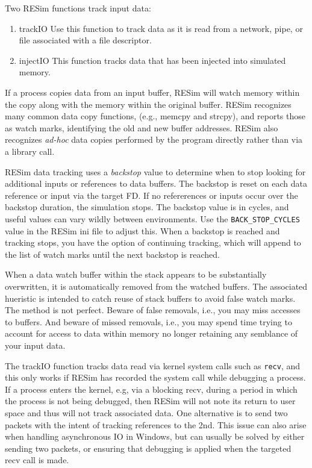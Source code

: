 \documentclass[titlepage]{article}
\begin{document}
Two RESim functions track input data:
\begin{enumerate}
\item {trackIO} Use this function to track data as it is read from a network, pipe, or file associated with a file descriptor.
\item {injectIO} This function tracks data that has been injected into simulated memory.
\end{enumerate}

If a process copies data from an input buffer, RESim will watch memory within the copy along with the memory within the original buffer.
RESim recognizes many common data copy functions, (e.g., memcpy and strcpy), and reports those as watch marks, identifying the old and new buffer addresses.
RESim also recognizes \textit{ad-hoc} data copies performed by the program directly rather than via a library call.

RESim data tracking uses a \textit{backstop} value to determine when to stop looking for additional inputs or references to data buffers.  The backstop is reset on each
data reference or input via the target FD.  If no refererences or inputs occur over the backstop duration, the simulation stops.  The backstop value is in 
cycles, and useful values can vary wildly between environments.  Use the {\tt BACK\_STOP\_CYCLES} value in the RESim ini file to adjust this.
When a backstop is reached and tracking stops, you have the option of continuing tracking, which will append to the list of watch marks until the next backstop is
reached.

When a data watch buffer within the stack appears to be substantially overwritten, it is automatically removed from the watched buffers.
The associated hueristic is intended to catch reuse of stack buffers to avoid false watch marks. The method is not perfect.  Beware of false removals, i.e., you
may miss accesses to buffers.  And beware of missed removals, i.e., you may spend time trying to account for access to data within memory
no longer retaining any semblance of your input data.

The trackIO function tracks data read via kernel system calls such as {\tt recv}, and this only works if RESim has recorded the system call while debugging a process.
If a process enters the kernel, e.g, via a blocking recv, during a period in which the process is not being debugged, then RESim will not note its return
to user space and thus will not track associated data.  One alternative is to send two packets with the intent of tracking references to the 2nd.
This issue can also arise when handling asynchronous IO in Windows, but can usually be solved by either sending two packets, or ensuring that debugging
is applied when the targeted recv call is made.
\end{document}
